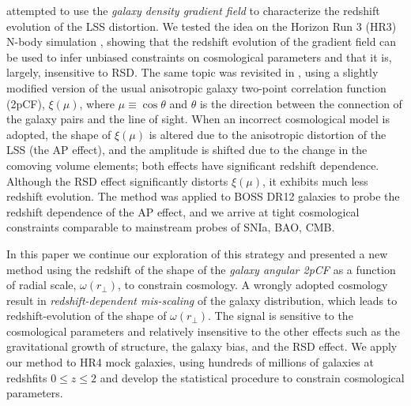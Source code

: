 \documentclass[iop]{emulateapj}
\begin{document}
\cite{Li2014} attempted to use the {\it galaxy density gradient field} 
to characterize the redshift evolution of the LSS distortion. 
We tested the idea on the Horizon Run 3 (HR3) N-body simulation \citep{horizonrun},
showing that the redshift evolution of the gradient field 
can be used to infer unbiased constraints on cosmological parameters and that it is, largely, insensitive to RSD.
The same topic was revisited in \cite{Li2015}, 
using a slightly modified version of the usual anisotropic galaxy two-point correlation function (2pCF), $\xi(\mu)$, 
where $\mu\equiv \cos \theta$ and $\theta$ is the direction between the connection of the galaxy pairs and the line of sight.
When an incorrect cosmological model is adopted, 
the shape of $\xi(\mu)$ is altered due to the anisotropic distortion of the LSS (the AP effect), 
and the amplitude is shifted due to the change in the comoving volume elements;
both effects have significant redshift dependence.
Although the RSD effect significantly distorts $\xi(\mu)$, 
it exhibits much less redshift evolution.
The method was applied to BOSS DR12 galaxies \citep{Li2016} to probe the redshift dependence of the AP effect, 
and we arrive at tight cosmological constraints comparable to mainstream probes of SNIa, BAO, CMB.

In this paper we continue our exploration of this strategy and presented 
a new method using the redshift of the shape of the {\it galaxy angular 2pCF} as a function of radial scale, $\omega(r_{\bot})$,
to constrain cosmology.
A wrongly adopted cosmology result in {\it redshift-dependent mis-scaling} of the galaxy distribution,
which leads to redshift-evolution of the shape of $\omega(r_{\bot})$.
The signal is sensitive to the cosmological parameters and relatively insensitive to the other effects such as the gravitational growth of structure,
the galaxy bias, and the RSD effect.
We apply our method to HR4 mock galaxies, using hundreds of millions of galaxies at redshfits $0\leq z\leq2$
and develop the statistical procedure to constrain cosmological parameters.
 
\end{document}

